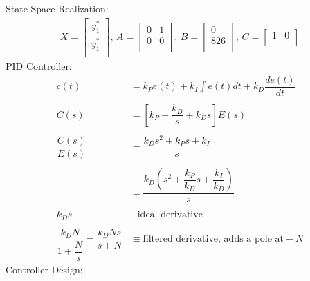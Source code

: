 \documentclass[12pt]{report}
\begin{document}
State Space Realization:
\begin{align} 
X =\begin{bmatrix}
  y_{1}^{*} \\
  \dot{y}_{1}^{*} \\
\end{bmatrix},\,
A =\begin{bmatrix}
    0 &1\\
   0 &0\\
\end{bmatrix},\,
B =\begin{bmatrix}
    0\\
   826\\
\end{bmatrix},\,
C =\begin{bmatrix}
    1 &0\\
\end{bmatrix}
\end{align}
\newline
PID Controller:
\begin{align}
c(t) &= k_{P}e(t) + k_{I} \int e(t)dt + k_{D}\dfrac{de(t)}{dt}\\\nonumber
\\
C(s) & = \left[ k_{P} + \dfrac{k_{D}}{s} + k_{D}s\right]E(s)\\\nonumber
\\
\dfrac{C(s)}{E(s)} & = \dfrac{k_{D}s^{2} + k_{P}s +k_{I}} {s}\\\nonumber
\\
&=\dfrac{k_{D}\left(s^{2}+ \dfrac{k_{P}}{k_{D}}s + \dfrac{k_{I}}{k_{D}}\right)}{s}\\\nonumber
\\
k_{D}s &\equiv \text{ideal derivative}\\\nonumber
\\
\dfrac{k_{D}N}{1 + \dfrac{N}{s}} = \dfrac{k_{D}Ns}{s + N} &\equiv \text{filtered derivative, adds a pole at} -N 
\end{align}
\newline
Controller Design:
\end{document}
